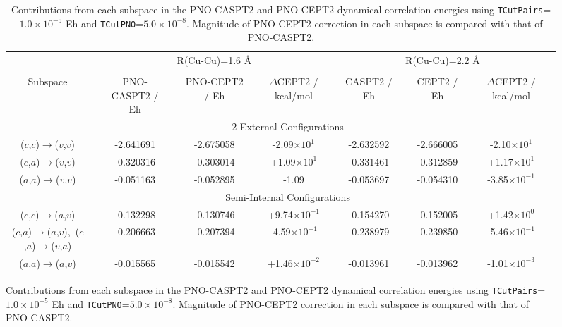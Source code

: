 \documentclass[aip,jcp,amsmath]{revtex4-1}
\begin{document}
{
\squeezetable
\begin{figure}    
\begin{longtable}[!ht]{cccccccccccccc}
  \caption{\label{tab:cu2o2-analysis}
    Contributions from each subspace in the PNO-CASPT2 and PNO-CEPT2 dynamical correlation energies using {\tt TCutPairs}=$1.0\times 10^{-5}$ Eh and {\tt TCutPNO}=$5.0\times 10^{-8}$.
    Magnitude of PNO-CEPT2 correction in each subspace is compared with that of PNO-CASPT2.
}
  \\
\hline  
\hline
 {}                                                               && \multicolumn{5}{c}{R(Cu-Cu)=1.6 \AA} && \multicolumn{5}{c}{R(Cu-Cu)=2.2 \AA} \\
\cline{3-14} \\      
 Subspace                                                         && PNO-CASPT2 / Eh && PNO-CEPT2 / Eh && $\Delta$CEPT2 / kcal/mol && CASPT2 / Eh && CEPT2 / Eh && $\Delta$CEPT2 / kcal/mol \\
\hline
                                                                  && \multicolumn{10}{c}{2-External Configurations} \\
($c$,$c$)$\rightarrow$($v$,$v$)                                   && -2.641691 && -2.675058 && -2.09$\times 10^{ 1}$ && -2.632592 && -2.666005 && -2.10$\times 10^{ 1}$  \\ %
($c$,$a$)$\rightarrow$($v$,$v$)                                   && -0.320316 && -0.303014 && +1.09$\times 10^{ 1}$ && -0.331461 && -0.312859 && +1.17$\times 10^{ 1}$  \\ %
($a$,$a$)$\rightarrow$($v$,$v$)                                   && -0.051163 && -0.052895 && -1.09                 && -0.053697 && -0.054310 && -3.85$\times 10^{-1}$  \\ %

                                                                  && \multicolumn{10}{c}{Semi-Internal Configurations} \\
($c$,$c$)$\rightarrow$($a$,$v$)                                   && -0.132298 && -0.130746 && +9.74$\times 10^{-1}$ && -0.154270 && -0.152005 && +1.42$\times 10^{ 0}$  \\   %
($c$,$a$)$\rightarrow$($a$,$v$),\ ($c$,$a$)$\rightarrow$($v$,$a$) && -0.206663 && -0.207394 && -4.59$\times 10^{-1}$ && -0.238979 && -0.239850 && -5.46$\times 10^{-1}$  \\ %
($a$,$a$)$\rightarrow$($a$,$v$)                                   && -0.015565 && -0.015542 && +1.46$\times 10^{-2}$ && -0.013961 && -0.013962 && -1.01$\times 10^{-3}$  \\ %


\end{longtable}
\end{figure}}
\end{document}
